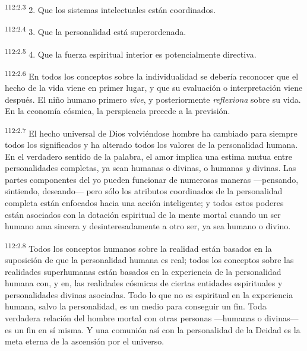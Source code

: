 \documentclass[twoside, 11pt]{book}
\begin{document}
\par
\textsuperscript{112:2.3} 2. Que los sistemas intelectuales están coordinados.

\par
\textsuperscript{112:2.4} 3. Que la personalidad está superordenada.

\par
\textsuperscript{112:2.5} 4. Que la fuerza espiritual interior es potencialmente directiva.

\par
\textsuperscript{112:2.6} En todos los conceptos sobre la individualidad se debería reconocer que el hecho de la vida viene en primer lugar, y que su evaluación o interpretación viene después. El niño humano primero \textit{vive}, y posteriormente \textit{reflexiona} sobre su vida. En la economía cósmica, la perspicacia precede a la previsión.

\par
\textsuperscript{112:2.7} El hecho universal de Dios volviéndose hombre ha cambiado para siempre todos los significados y ha alterado todos los valores de la personalidad humana. En el verdadero sentido de la palabra, el amor implica una estima mutua entre personalidades completas, ya sean humanas o divinas, o humanas \textit{y} divinas. Las partes componentes del yo pueden funcionar de numerosas maneras ---pensando, sintiendo, deseando--- pero sólo los atributos coordinados de la personalidad completa están enfocados hacia una acción inteligente; y todos estos poderes están asociados con la dotación espiritual de la mente mortal cuando un ser humano ama sincera y desinteresadamente a otro ser, ya sea humano o divino.

\par
\textsuperscript{112:2.8} Todos los conceptos humanos sobre la realidad están basados en la suposición de que la personalidad humana es real; todos los conceptos sobre las realidades superhumanas están basados en la experiencia de la personalidad humana con, y en, las realidades cósmicas de ciertas entidades espirituales y personalidades divinas asociadas. Todo lo que no es espiritual en la experiencia humana, salvo la personalidad, es un medio para conseguir un fin. Toda verdadera relación del hombre mortal con otras personas ---humanas o divinas--- es un fin en sí misma. Y una comunión así con la personalidad de la Deidad es la meta eterna de la ascensión por el universo.
\end{document}
